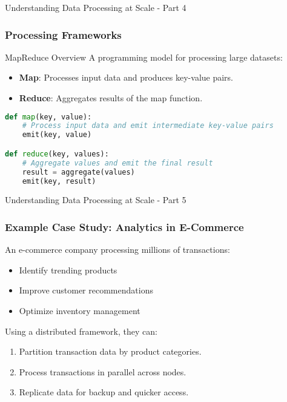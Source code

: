 \documentclass[aspectratio=169]{beamer}
\begin{document}
\begin{frame}[fragile]{Understanding Data Processing at Scale - Part 4}
    \frametitle{Processing Frameworks}
    \begin{block}{MapReduce Overview}
        A programming model for processing large datasets:
        \begin{itemize}
            \item \textbf{Map}: Processes input data and produces key-value pairs.
            \item \textbf{Reduce}: Aggregates results of the map function.
        \end{itemize}
    \end{block}
    
    \begin{lstlisting}[language=Python]
def map(key, value):
    # Process input data and emit intermediate key-value pairs
    emit(key, value)

def reduce(key, values):
    # Aggregate values and emit the final result
    result = aggregate(values)
    emit(key, result)
    \end{lstlisting}
\end{frame}

\begin{frame}[fragile]{Understanding Data Processing at Scale - Part 5}
    \frametitle{Example Case Study: Analytics in E-Commerce}
    An e-commerce company processing millions of transactions:
    \begin{itemize}
        \item Identify trending products
        \item Improve customer recommendations
        \item Optimize inventory management
    \end{itemize}
    Using a distributed framework, they can:
    \begin{enumerate}
        \item Partition transaction data by product categories.
        \item Process transactions in parallel across nodes.
        \item Replicate data for backup and quicker access.
    \end{enumerate}
\end{frame}
\end{document}
